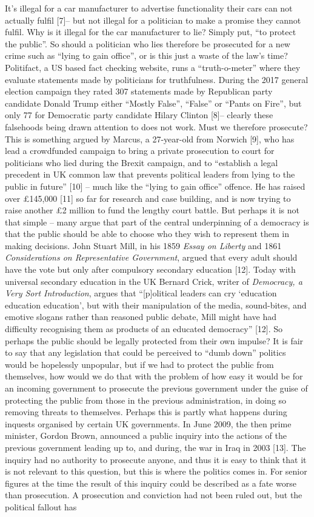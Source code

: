 It’s illegal for a car manufacturer to advertise functionality their cars can not actually fulfil [7]– but not illegal for a politician to make a promise they cannot fulfil. Why is it illegal for the car manufacturer to lie? Simply put, “to protect the public”. So should a politician who lies therefore be prosecuted for a new crime such as “lying to gain office”, or is this just a waste of the law’s time? Politifact, a US based fact checking website, runs a “truth-o-meter” where they evaluate statements made by politicians for truthfulness. During the 2017 general election campaign they rated 307 statements made by Republican party candidate Donald Trump either “Mostly False”, “False” or “Pants on Fire”, but only 77 for Democratic party candidate Hilary Clinton [8]– clearly these falsehoods being drawn attention to does not work. Must we therefore prosecute? This is something argued by Marcus, a 27-year-old from Norwich [9], who has lead a crowdfunded campaign to bring a private prosecution to court for politicians who lied during the Brexit campaign, and to “establish a legal precedent in UK common law that prevents political leaders from lying to the public in future” [10] – much like the “lying to gain office” offence. He has raised over £145,000 [11] so far for research and case building, and is now trying to raise another £2 million to fund the lengthy court battle. But perhaps it is not that simple – many argue that part of the central underpinning of a democracy is that the public should be able to choose who they wish to represent them in making decisions.  John Stuart Mill, in his 1859 \textit{Essay on Liberty} and 1861 \textit{Considerations on Representative Government}, argued that every adult should have the vote but only after compulsory secondary education [12]. Today with universal secondary education in the UK Bernard Crick, writer of \textit{Democracy, a Very Sort Introduction}, argues that “[p]olitical leaders can cry ‘education education education’, but with their manipulation of the media, sound-bites, and emotive slogans rather than reasoned public debate, Mill might have had difficulty recognising them as products of an educated democracy” [12]. So perhaps the public should be legally protected from their own impulse? It is fair to say that any legislation that could be perceived to “dumb down” politics would be hopelessly unpopular, but if we had to protect the public from themselves, how would we do that with the problem of how easy it would be for an incoming government to prosecute the previous government under the guise of protecting the public from those in the previous administration, in doing so removing threats to themselves. Perhaps this is partly what happens during inquests organised by certain UK governments. In June 2009, the then prime minister, Gordon Brown, announced a public inquiry into the actions of the previous government leading up to, and during, the war in Iraq in 2003 [13]. The inquiry had no authority to prosecute anyone, and thus it is easy to think that it is not relevant to this question, but this is where the politics comes in. For senior figures at the time the result of this inquiry could be described as a fate worse than prosecution. A prosecution and conviction had not been ruled out, but the political fallout has 
